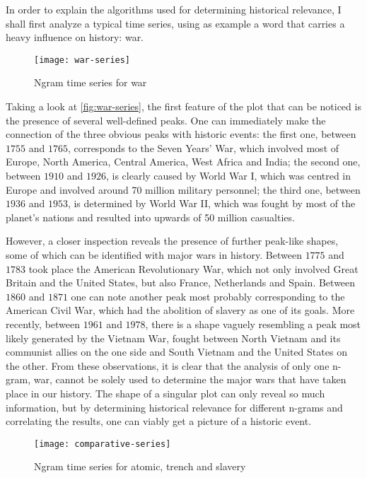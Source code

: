 
In order to explain the algorithms used for determining historical relevance, I shall first analyze a typical time series, using as example a word that carries a heavy influence on history: war.

\begin{figure}
\centering
\texttt{[image: war-series]}
\caption{Ngram time series for war}
\label{fig:war-series}
\end{figure}

Taking a look at \autoref{fig:war-series}, the first feature of the plot that can be noticed is the presence of several well-defined peaks. One can immediately make the connection of the three obvious peaks with historic events: the first one, between $1755$ and $1765$, corresponds to the Seven Years' War, which involved most of Europe, North America, Central America, West Africa and India; the second one, between $1910$ and $1926$, is clearly caused by World War I, which was centred in Europe and involved around 70 million military personnel; the third one, between $1936$ and $1953$, is determined by World War II, which was fought by most of the planet's nations and resulted into upwards of 50 million casualties.

However, a closer inspection reveals the presence of further peak-like shapes, some of which can be identified with major wars in history. Between $1775$ and $1783$ took place the American Revolutionary War, which not only involved Great Britain and the United States, but also France, Netherlands and Spain. Between $1860$ and $1871$ one can note another peak most probably corresponding to the American Civil War, which had the abolition of slavery as one of its goals. More recently, between $1961$ and $1978$, there is a shape vaguely resembling a peak most likely generated by the Vietnam War, fought between North Vietnam and its communist allies on the one side and South Vietnam and the United States on the other. From these observations, it is clear that the analysis of only one n-gram, war, cannot be solely used to determine the major wars that have taken place in our history. The shape of a singular plot can only reveal so much information, but by determining historical relevance for different n-grams and correlating the results, one can viably get a picture of a historic event.

\begin{figure}
\begin{minipage}{\textwidth}
\centering
\texttt{[image: comparative-series]}
\caption{Ngram time series for atomic, trench and slavery}
\label{fig:comparative-series}
\end{minipage}
\end{figure}

